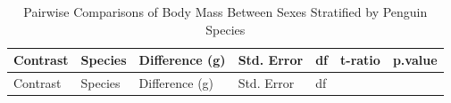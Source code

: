\documentclass[
  11pt,
]{article}
\begin{document}
\begin{longtable}[]{@{}
  >{\raggedright\arraybackslash}p{}
  >{\raggedright\arraybackslash}p{}
  >{\raggedleft\arraybackslash}p{}
  >{\raggedleft\arraybackslash}p{}
  >{\raggedleft\arraybackslash}p{}
  >{\raggedleft\arraybackslash}p{}
  >{\raggedleft\arraybackslash}p{}@{}}
\caption{Pairwise Comparisons of Body Mass Between Sexes Stratified by
Penguin Species}\tabularnewline
\toprule\noalign{}
\begin{minipage}[b]{\linewidth}\raggedright
Contrast
\end{minipage} & \begin{minipage}[b]{\linewidth}\raggedright
Species
\end{minipage} & \begin{minipage}[b]{\linewidth}\raggedleft
Difference (g)
\end{minipage} & \begin{minipage}[b]{\linewidth}\raggedleft
Std. Error
\end{minipage} & \begin{minipage}[b]{\linewidth}\raggedleft
df
\end{minipage} & \begin{minipage}[b]{\linewidth}\raggedleft
t-ratio
\end{minipage} & \begin{minipage}[b]{\linewidth}\raggedleft
p.value
\end{minipage} \\
\midrule\noalign{}
\endfirsthead
\toprule\noalign{}
\begin{minipage}[b]{\linewidth}\raggedright
Contrast
\end{minipage} & \begin{minipage}[b]{\linewidth}\raggedright
Species
\end{minipage} & \begin{minipage}[b]{\linewidth}\raggedleft
Difference (g)
\end{minipage} & \begin{minipage}[b]{\linewidth}\raggedleft
Std. Error
\end{minipage} & \begin{minipage}[b]{\linewidth}\raggedleft
df
\end{minipage} & \begin{minipage}[b]{\linewidth}\raggedleft

\end{minipage}
\end{longtable}
\end{document}

